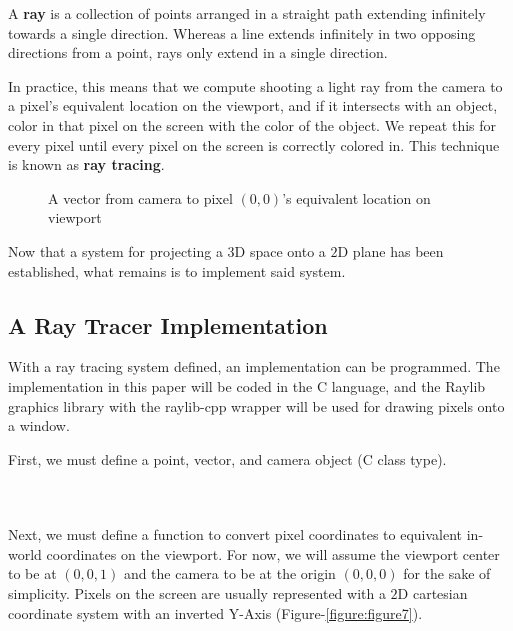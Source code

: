 \documentclass[a4paper]{article}
\newenvironment{code}{\captionsetup{type=listing}}{}
\newcommand{\CC}{C\nolinebreak\hspace{-.05em}\raisebox{.4ex}{\tiny\bf +}\nolinebreak\hspace{-.10em}\raisebox{.4ex}{\tiny\bf +}}
\begin{document}
A \textbf{ray} is a collection of points arranged in a straight path extending infinitely towards a single direction. Whereas a line extends infinitely in two opposing directions from a point, rays only extend in a single direction.

In practice, this means that we compute shooting a light ray from the camera to a pixel's equivalent location on the viewport, and if it intersects with an object, color in that pixel on the screen with the color of the object. We repeat this for every pixel until every pixel on the screen is correctly colored in. This technique is known as \textbf{ray tracing}.

\begin{figure}[htp]
    \centering
    
    \caption{A vector from camera to pixel $(0, 0)$'s equivalent location on viewport}\label{figure:raytopixelonviewport}
\end{figure}

Now that a system for projecting a $3$D space onto a $2$D plane has been established, what remains is to implement said system.

\subsection{A Ray Tracer Implementation}
With a ray tracing system defined, an implementation can be programmed. The implementation in this paper will be coded in the \CC{} language, and the Raylib graphics library with the raylib-cpp wrapper will be used for drawing pixels onto a window.\autocite{Raylib}\autocite{raylib-cpp}

First, we must define a point, vector, and camera object (\CC{} class type).

\begin{code}
    \caption{point.hpp}
    \inputminted{cpp}{point.hpp}
\end{code}

\begin{code}
\caption{vector.hpp}
\inputminted[breaklines]{cpp}{vector.hpp}
\end{code}

\begin{code}
\caption{camera.hpp}
\inputminted[breaklines]{cpp}{camera.hpp}
\end{code}

Next, we must define a function to convert pixel coordinates to equivalent in-world coordinates on the viewport. For now, we will assume the viewport center to be at $(0, 0, 1)$ and the camera to be at the origin $(0, 0, 0)$ for the sake of simplicity. Pixels on the screen are usually represented with a $2$D cartesian coordinate system with an inverted Y-Axis (Figure-\ref{figure:figure7}).
\end{document}
